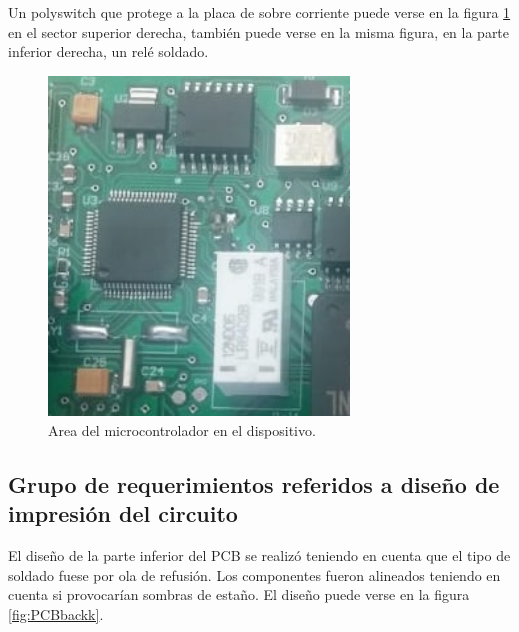 
Un polyswitch que protege a la placa de sobre corriente puede verse en la figura \ref{fig:polyrele} en el sector superior derecha, también puede verse en la misma figura, en la parte inferior derecha, un relé soldado.

\begin{figure}[!htb]
	\centering
	\includegraphics[width=80mm,keepaspectratio]{Figures/polyswitchyrele.jpg}
	\caption{ Area del microcontrolador en el dispositivo.}
	\label{fig:polyrele}
\end{figure}

\subsection{Grupo de requerimientos referidos a diseño  de impresión del circuito}

El diseño de la parte inferior del PCB se realizó teniendo en cuenta que el tipo de soldado fuese por ola de refusión. Los componentes fueron alineados teniendo en cuenta si provocarían sombras de estaño. El diseño puede verse en la figura \ref{fig:PCBbackk}.





 


